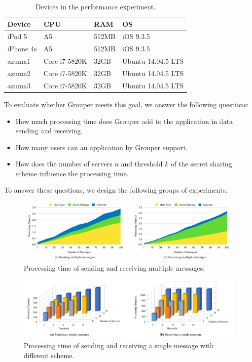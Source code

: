 \documentclass[twocolumn,10pt]{article}
\begin{document}
\begin{table}[!htb]
	\footnotesize
	\centering  
	\caption{Devices in the performance experiment.}
	\label{my-label}
	\begin{tabular}{llll}
		\hline
		\textbf{Device} & \textbf{CPU} & \textbf{RAM} & \textbf{OS} \\ \hline
		iPod 5 & A5 & 512MB & iOS 9.3.5 \\
		iPhone 4s & A5 & 512MB & iOS 9.3.5 \\
		azuma1 & Core i7-5820K & 32GB & Ubuntu 14.04.5 LTS \\
		azuma2 & Core i7-5820K & 32GB & Ubuntu 14.04.5 LTS \\
		azuma3 & Core i7-5820K & 32GB & Ubuntu 14.04.5 LTS \\ \hline
	\end{tabular}
\end{table}

To evaluate whether Grouper meets this goal, we answer the following questions:

\begin{itemize}
	\setlength{\itemsep}{1pt}
	\setlength{\parskip}{0pt}
	\setlength{\parsep}{0pt}
	\item How much processing time does Grouper add to the application in data sending and receiving.
	\item How many users can an application by Grouper support.
	\item How does the number of servers $n$ and threshold ${k}$ of the secret sharing scheme influence the processing time.
\end{itemize}

To answer these questions, we design the following groups of experiments.

\begin{figure}[t]
	\centering
	\includegraphics[scale=0.13]{multiple_messages}
	\caption{Processing time of sending and receiving multiple messages.}
\end{figure}

\begin{figure}[t]
	\centering
	\includegraphics[scale=0.35]{3d}
	\caption{Processing time of sending and receiving a single message with different scheme.}
\end{figure}
\end{document}
